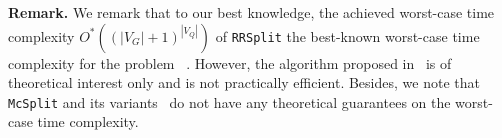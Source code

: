 \smallskip
\noindent\textbf{Remark.}  We remark that to our best knowledge, the achieved worst-case time complexity $O^*((|V_G|+1)^{|V_Q|})$ of \texttt{RRSplit}  
{\chengB the best-known worst-case time complexity for the problem}
~\cite{suters2005new}. However, the algorithm proposed in~\cite{suters2005new} is of theoretical {\chengB interest} only and is not {\chengB practically} efficient. Besides, we note that \texttt{McSplit} and its variants~\cite{zhoustrengthened,liu2020learning,liu2023hybrid,mccreesh2017partitioning} do not have any theoretical guarantees on the worst-case time complexity. 


